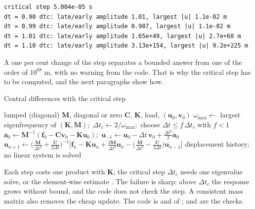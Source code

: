 \begin{lstlisting}[numbers=none,language={},keywordstyle={},commentstyle={},frame=single,aboveskip=2pt]
critical step 5.004e-05 s
dt = 0.90 dtc: late/early amplitude 1.01, largest |u| 1.1e-02 m
dt = 0.99 dtc: late/early amplitude 0.987, largest |u| 1.1e-02 m
dt = 1.01 dtc: late/early amplitude 1.65e+49, largest |u| 2.7e+68 m
dt = 1.10 dtc: late/early amplitude 3.13e+154, largest |u| 9.2e+225 m
\end{lstlisting}

A one per cent change of the step separates a bounded answer from one of the order of $10^{68}$ m, with no warning from the code. That is why the critical step has to be computed, and the next paragraphs show how.


\begin{algbox}{Central differences with the critical step}
\begin{pseudo}
\Require lumped (diagonal) $\bm M$, diagonal or zero $\bm C$, $\bm K$, load, $(\bm u_0,\bm v_0)$
\State $\omega_{\max}\gets$ largest eigenfrequency of $(\bm K,\bm M)$;\ $\Delta t_c\gets2/\omega_{\max}$;\ choose $\Delta t\le f\,\Delta t_c$ with $f<1$
\State $\bm a_0\gets\bm M^{-1}(\bm f_0-\bm C\bm v_0-\bm K\bm u_0)$;\ $\bm u_{-1}\gets\bm u_0-\Delta t\,\bm v_0+\tfrac{\Delta t^2}{2}\bm a_0$
  \State $\bm u_{n+1}\gets\big(\tfrac{\bm M}{\Delta t^2}+\tfrac{\bm C}{2\Delta t}\big)^{-1}\big[\bm f_n-\bm K\bm u_n+\tfrac{2\bm M}{\Delta t^2}\bm u_n-\big(\tfrac{\bm M}{\Delta t^2}-\tfrac{\bm C}{2\Delta t}\big)\bm u_{n-1}\big]$ 
\EndFor
\Ensure displacement history; no linear system is solved
\end{pseudo}
\end{algbox}

Each step costs one product with $\bm K$; the critical step $\Delta t_c$ needs one eigenvalue solve, or the element-wise estimate . The failure is sharp: above $\Delta t_c$ the response grows without bound, and the code does not check the step. A consistent mass matrix also removes the cheap update. The code is  and  of ;  and  are the checks.

